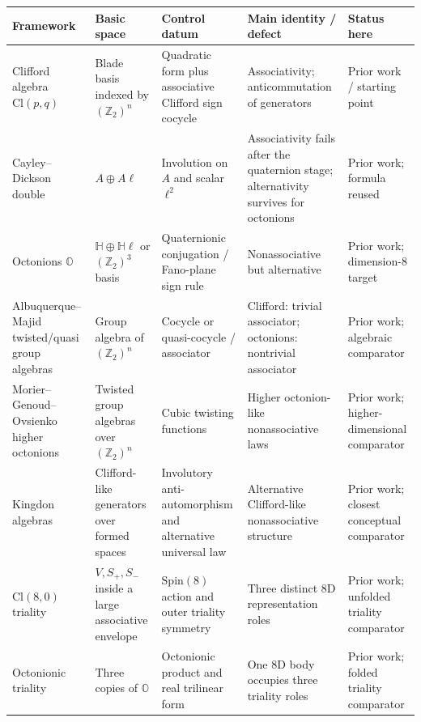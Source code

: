 \documentclass[11pt]{article}
\newcommand{\Ztwo}{\mathbb Z_2}
\newcommand{\Cl}{\mathrm{Cl}}
\begin{document}
\begin{center}
\renewcommand{\arraystretch}{1.25}
\footnotesize
\begin{tabular}{>{\raggedright\arraybackslash}p{}
                >{\raggedright\arraybackslash}p{}
                >{\raggedright\arraybackslash}p{}
                >{\raggedright\arraybackslash}p{}
                >{\raggedright\arraybackslash}p{}}
\toprule
\textbf{Framework} & \textbf{Basic space} & \textbf{Control datum} & \textbf{Main identity / defect} & \textbf{Status here} \\
\midrule
Clifford algebra $\Cl(p,q)$ & Blade basis indexed by $(\Ztwo)^n$ & Quadratic form plus associative Clifford sign cocycle & Associativity; anticommutation of generators & Prior work / starting point \\
\addlinespace
Cayley--Dickson double & $A\oplus A\ell$ & Involution on $A$ and scalar $\ell^2$ & Associativity fails after the quaternion stage; alternativity survives for octonions & Prior work; formula reused \\
\addlinespace
Octonions $\mathbb O$ & $\mathbb H\oplus\mathbb H\ell$ or $(\Ztwo)^3$ basis & Quaternionic conjugation / Fano-plane sign rule & Nonassociative but alternative & Prior work; dimension-$8$ target \\
\addlinespace
Albuquerque--Majid twisted/quasi group algebras & Group algebra of $(\Ztwo)^n$ & Cocycle or quasi-cocycle / associator & Clifford: trivial associator; octonions: nontrivial associator & Prior work; algebraic comparator \\
\addlinespace
Morier--Genoud--Ovsienko higher octonions & Twisted group algebras over $(\Ztwo)^n$ & Cubic twisting functions & Higher octonion-like nonassociative laws & Prior work; higher-dimensional comparator \\
\addlinespace
Kingdon algebras & Clifford-like generators over formed spaces & Involutory anti-automorphism and alternative universal law & Alternative Clifford-like nonassociative structure & Prior work; closest conceptual comparator \\
\addlinespace
$\Cl(8,0)$ triality & $V,S_+,S_-$ inside a large associative envelope & $\mathrm{Spin}(8)$ action and outer triality symmetry & Three distinct $8$D representation roles & Prior work; unfolded triality comparator \\
\addlinespace
Octonionic triality & Three copies of $\mathbb O$ & Octonionic product and real trilinear form & One $8$D body occupies three triality roles & Prior work; folded triality comparator \\

\end{tabular}
\end{center}
\end{document}

